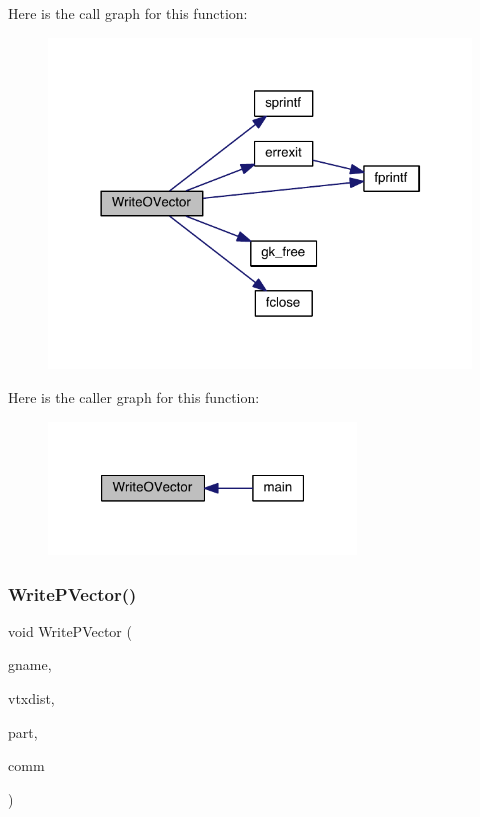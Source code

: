 Here is the call graph for this function\+:\nopagebreak
\begin{figure}[H]
\begin{center}
\leavevmode
\includegraphics[width=322pt]{a00861_a9ff4864d8e906761bd6c55597c085e3b_cgraph}
\end{center}
\end{figure}
Here is the caller graph for this function\+:\nopagebreak
\begin{figure}[H]
\begin{center}
\leavevmode
\includegraphics[width=232pt]{a00861_a9ff4864d8e906761bd6c55597c085e3b_icgraph}
\end{center}
\end{figure}
\mbox{\label{a00861_a19b5376612558b2381990f2e7a06bffc}} 
\subsubsection{\texorpdfstring{Write\+P\+Vector()}{WritePVector()}}
{\footnotesize\ttfamily void Write\+P\+Vector (\begin{DoxyParamCaption}\item[{char $\ast$}]{gname,  }\item[{\hyperlink{a00876_aaa5262be3e700770163401acb0150f52}{idx\+\_\+t} $\ast$}]{vtxdist,  }\item[{\hyperlink{a00876_aaa5262be3e700770163401acb0150f52}{idx\+\_\+t} $\ast$}]{part,  }\item[{M\+P\+I\+\_\+\+Comm}]{comm }\end{DoxyParamCaption})}

